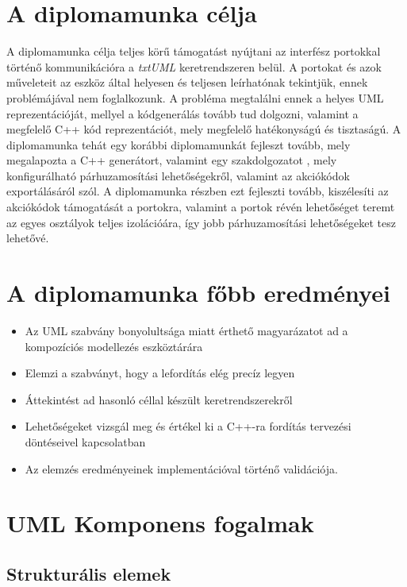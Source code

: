 \documentclass[a4paper,12pt]{report}
\begin{document}
\section{A diplomamunka célja}
A diplomamunka célja teljes körű támogatást nyújtani az interfész portokkal történő kommunikációra a \textit{txtUML} keretrendszeren belül. A portokat és azok műveleteit az eszköz által helyesen és teljesen leírhatónak tekintjük, ennek problémájával nem foglalkozunk. A probléma megtalálni ennek a helyes UML reprezentációját, mellyel a kódgenerálás tovább tud dolgozni, valamint a megfelelő C++ kód reprezentációt, mely megfelelő hatékonyságú és tisztaságú. A diplomamunka tehát egy korábbi diplomamunkát fejleszt tovább\cite{hack_dip}, mely megalapozta a C++ generátort, valamint egy szakdolgozatot \cite{my_szakdolg}, mely konfigurálható párhuzamosítási lehetőségekről, valamint az akciókódok exportálásáról szól. A diplomamunka részben ezt fejleszti tovább, kiszélesíti az akciókódok támogatását a portokra, valamint a portok révén lehetőséget teremt az egyes osztályok teljes izolációára, így jobb párhuzamosítási lehetőségeket tesz lehetővé.

\section{A diplomamunka főbb eredményei}
\begin{itemize}
\item Az UML szabvány bonyolultsága miatt érthető magyarázatot ad a kompozíciós modellezés eszköztárára
\item Elemzi a szabványt, hogy a lefordítás elég precíz legyen
\item Áttekintést ad hasonló céllal készült keretrendszerekről
\item Lehetőségeket vizsgál meg és értékel ki a C++-ra fordítás tervezési döntéseivel kapcsolatban
\item Az elemzés eredményeinek implementációval történő validációja.
\end{itemize}

\section{UML Komponens fogalmak}
\subsection{Strukturális elemek}
\end{document}
